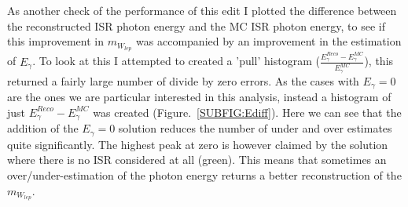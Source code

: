 \\\\
As another check of the  performance of this edit I plotted the difference between the reconstructed ISR photon energy and the MC ISR photon energy, to see if this improvement in ${m}_{W_{lep}}$ was accompanied by an improvement in the estimation of $E_{\gamma}$. To look at this I attempted to created a 'pull' histogram ($\frac{E_{\gamma}^{Reco} - E_{\gamma}^{MC}}{E_{\gamma}^{MC}}$), this returned a fairly large number of divide by zero errors. As the cases with  $E_{\gamma} = 0$ are the ones we are particular interested in this analysis, instead a histogram of just $E_{\gamma}^{Reco} - E_{\gamma}^{MC}$ was created (Figure.~\ref{SUBFIG:Ediff}). Here we can see that the addition of the $E_{\gamma} = 0$ solution  reduces the number of under and over estimates quite significantly. The highest peak at zero is however claimed by the solution where there is no ISR considered at all (green). This means that sometimes an over/under-estimation of the photon energy returns a better reconstruction of the ${m}_{W_{lep}}$.


